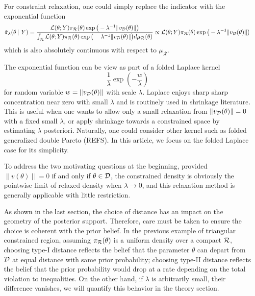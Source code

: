 \documentclass[10pt,fleqn]{article}
\DeclareMathOperator{\1}{\mathbbm{1}} \DeclareMathOperator{\bigO}{\mc O}
\begin{document}
For constraint relaxation, one could simply replace
the indicator  with the exponential function
\begin{equation}
\label{EQ:relaxedDensityPosMeasure}
\tilde{\pi}_\lambda(\theta \mid Y) =
\frac{\mathcal{L}(\theta;
Y)\pi_\mathcal{R}(\theta)\exp\big(-
\lambda^{-1}{\|v_{\mathcal{D}}(\theta)\|}\big)}{\int_{\mathcal{R}}\mathcal{L}(\theta; Y)
\pi_\mathcal{R}(\theta)\exp\big(-{\lambda^{-1}}{\|v_{\mathcal{D}}(\theta)\|}\big)
d\mu_\mathcal{R}(\theta)} \propto
\mathcal{L}(\theta; Y)
\pi_\mathcal{R}(\theta)\exp\big(-{\lambda^{-1}}{\|v_{\mathcal{D}}(\theta)\|}\big)
\end{equation}
which is also absolutely continuous with respect to $\mu_\mathcal{R} $. 

The exponential function can be view as part of a folded Laplace kernel
$$\frac{1}{\lambda}\exp(-\frac{w}{\lambda})$$
 for random variable $w=\|v_{\mathcal{D}}(\theta) \|$ with scale $\lambda$. Laplace enjoys sharp sharp concentration near zero with small $\lambda$ and is routinely used in shrinkage literature. This is useful when one wants to allow only a small relaxation from $\|v_{\mathcal{D}}(\theta) \|=0$ with a fixed small $\lambda$, or apply shrinkage towards a constrained space by estimating $\lambda$ posteriori. Naturally, one could consider other kernel such as folded generalized double Pareto (REFS). In this article, we focus on the folded Laplace case for its simplicity.

To address the two motivating questions at the beginning, provided $\|v(\theta)\|=0$ if and only if $\theta\in \mathcal{D}$, the constrained density is obviously the pointwise limit of relaxed density when $\lambda\to 0$, and this relaxation method is generally applicable with little restriction.
   
As shown in the last section, the choice of distance has an impact on the geometry of the posterior support. Therefore, care must be taken to ensure the choice is coherent with the prior belief. In the previous example of triangular constrained region, assuming $\pi_{\mathcal{R}}(\theta)$ is a uniform density over a compact $\mathcal{R}$, choosing type-I distance reflects the belief that the parameter $\theta$ can depart from $\mathcal{D}$ at equal distance with same prior probability; choosing type-II distance reflects the belief that the prior probability would drop at a rate depending on the total violation to inequalities. On the other hand, if $\lambda$ is arbitrarily small, their difference  vanishes, we will quantify this behavior in the theory section.
\end{document}
